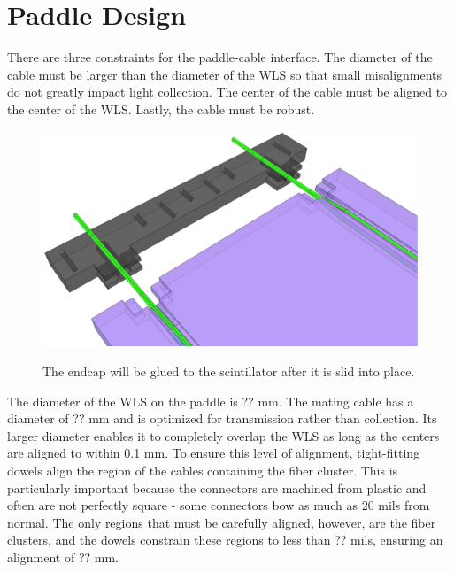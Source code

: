 \section{Paddle Design}

There are three constraints for the paddle-cable interface.  The diameter of the cable must be larger than the diameter of the WLS so that small misalignments do not greatly impact light collection.  The center of the cable must be aligned to the center of the WLS.  Lastly, the cable must be robust.

\begin{figure}[ht]
\centering
\includegraphics[width=1.0\textwidth]{figures/veto_assembly.eps}
\label{fig:paddleAssembly}
\caption{The endcap will be glued to the scintillator after it is slid into place.}
\end{figure}

The diameter of the WLS on the paddle is ?? mm.  The mating cable has a diameter of ?? mm and is optimized for transmission rather than collection.  Its larger diameter enables it to completely overlap the WLS as long as the centers are aligned to within 0.1 mm.  To ensure this level of alignment, tight-fitting dowels align the region of the cables containing the fiber cluster.  This is particularly important because the connectors are machined from plastic and often are not perfectly square - some connectors bow as much as 20 mils from normal.  The only regions that must be carefully aligned, however, are the fiber clusters, and the dowels constrain these regions to less than ?? mils, ensuring an alignment of ?? mm.  

